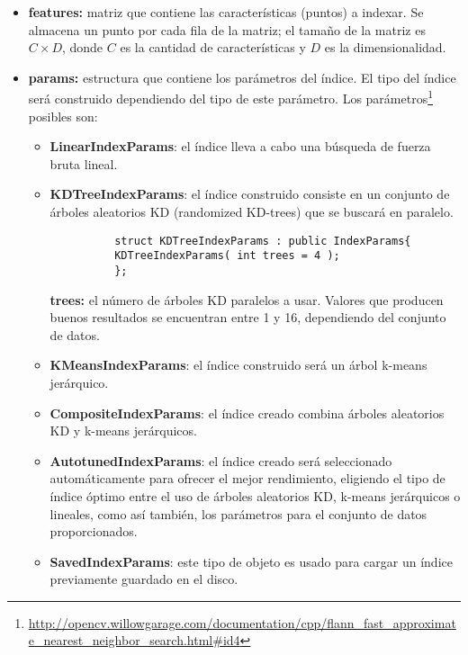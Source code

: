\begin{itemize}
  \item \textbf{features:} matriz que contiene las características (puntos) a indexar. Se almacena un punto por cada fila de la matriz; el tamaño de la matriz es $C \times D$, donde $C$ es la cantidad de caracter\'isticas y $D$ es la dimensionalidad.
  \item \textbf{params:} estructura que contiene los parámetros del índice. El tipo del índice será construido dependiendo del tipo de este parámetro. Los parámetros\footnote{\url{http://opencv.willowgarage.com/documentation/cpp/flann_fast_approximate_nearest_neighbor_search.html\#id4}} posibles son:
  \begin{itemize}
    \item \textbf{LinearIndexParams}: el índice lleva a cabo una búsqueda de fuerza bruta lineal.
    \item \textbf{KDTreeIndexParams}: el índice construido consiste en un conjunto de árboles aleatorios KD (randomized KD-trees) que se buscará en paralelo.
	\begin{lstlisting}
	      struct KDTreeIndexParams : public IndexParams{
		  KDTreeIndexParams( int trees = 4 );
	      };
	\end{lstlisting}
	\textbf{trees:} el número de árboles KD paralelos a usar. Valores que producen buenos resultados se encuentran entre 1 y 16, dependiendo del conjunto de datos.
    \item \textbf{KMeansIndexParams}: el índice construido será un árbol k-means jerárquico.
    \item \textbf{CompositeIndexParams}: el índice creado combina árboles aleatorios KD y k-means jerárquicos.
    \item \textbf{AutotunedIndexParams}: el índice creado será seleccionado automáticamente para ofrecer el mejor rendimiento, eligiendo el tipo de índice óptimo entre el uso de árboles aleatorios KD, k-means jerárquicos o lineales, como así también, los parámetros para el conjunto de datos proporcionados.
    \item \textbf{SavedIndexParams}: este tipo de objeto es usado para cargar un índice previamente guardado en el disco.
  \end{itemize}
\end{itemize}

